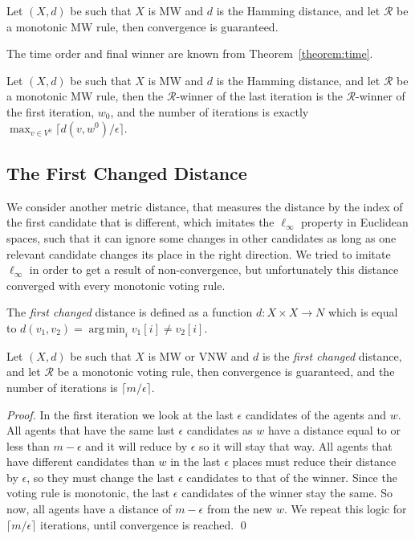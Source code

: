 \documentclass[runningheads,envcountsame]{llncs}
\DeclareMathOperator*{\argmin}{arg\,min}
\begin{document}
\begin{theorem}\label{theorem:mw}
  Let $(X, d)$ be such that $X$ is MW and $d$ is the Hamming distance, and let $\mathcal{R}$ be a monotonic MW rule, then convergence is guaranteed.
\end{theorem}

The time order and final winner are known from Theorem~\ref{theorem:time}.

\begin{corollary}
  Let $(X, d)$ be such that $X$ is MW and $d$ is the Hamming distance, and let $\mathcal{R}$ be a monotonic MW rule, then the $\mathcal{R}$-winner of the last iteration is the $\mathcal{R}$-winner of the first iteration, $w_0$, and the number of iterations is exactly $\max_{v \in V^0} \lceil d(v, w^0)/\epsilon\rceil$.
\end{corollary}


\subsection{The First Changed Distance}

We consider another metric distance, that measures the distance by the index of the first candidate that is different, which imitates the $\ell_\infty$ property in Euclidean spaces, such that it can ignore some changes in other candidates as long as one relevant candidate changes its place in the right direction. We tried to imitate $\ell_\infty$ in order to get a result of non-convergence, but unfortunately this distance converged with every monotonic voting rule.

\begin{definition}
  The \emph{first changed} distance is defined as a function $d:X \times X \to N$ which is equal to $d(v_1,v_2) = \argmin_i{v_1[i]\neq v_2[i]}$.
\end{definition}

\begin{theorem}\label{theorem:first changed}
  Let $(X, d)$ be such that $X$ is MW or VNW and $d$ is the \emph{first changed} distance, and let $\mathcal{R}$ be a monotonic voting rule, then convergence is guaranteed, and the number of iterations is $\lceil m/\epsilon \rceil$.
\end{theorem}

\begin{proof}
  In the first iteration we look at the last $\epsilon$ candidates of the agents and $w$. All agents that have the same last $\epsilon$ candidates as $w$ have a distance equal to or less than $m-\epsilon$ and it will reduce by $\epsilon$ so it will stay that way. All agents that have different candidates than $w$ in the last $\epsilon$ places must reduce their distance by $\epsilon$, so they must change the last $\epsilon$ candidates to that of the winner. Since the voting rule is monotonic, the last $\epsilon$ candidates of the winner stay the same. So now, all agents have a distance of $m-\epsilon$ from the new $w$. We repeat this logic for $\lceil m/\epsilon \rceil$ iterations, until convergence is reached.
\qed\end{proof}
\end{document}
